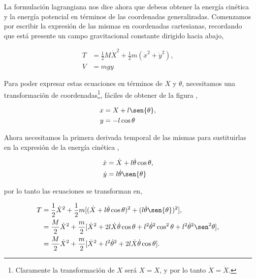 \documentclass[a4paper,10pt]{article}
\numberwithin{equation}{section}
\begin{document}
\vspace{.3cm}

La formulación lagrangiana nos dice ahora que debeos obtener la energía cinética y la 
energía potencial en términos de las coordenadas generalizadas. Comenzamos por escribir 
la expresión de las mismas en coordenadas cartesianas, recordando que está presente un 
campo gravitacional constante dirigido hacia abajo,

\begin{align}
\label{eq:pendu5}
 T &= \frac{1}{2} M \dot{X}^2 + \frac{1}{2}m(\dot{x}^2+\dot{y}^2), \\
\label{eq:pendu6}
 V &= mgy
 \end{align}

Para poder expresar estas ecuaciones en términos de $X$ y $\theta$, necesitamos una 
transformación de coordenadas\footnote{Claramente la transformación de $X$ será $X = X$, 
y por lo tanto $\dot{X} = \dot{X}$.}, fáciles de obtener de la figura 
,

\begin{align}
 x &= X + l \sen{\theta}, \\
 y &= -l \cos{\theta}
\end{align}

Ahora necesitamos la primera derivada temporal de las mismas para sustituirlas en 
la expresión de la energía cinética ,

\begin{align}
 \dot{x} &= \dot{X} + l \dot{\theta} \cos{\theta}, \\
 \dot{y} &= l \dot{\theta} \sen{\theta}
\end{align}

por lo tanto las ecuaciones  se transforman en,

\begin{align}
 \begin{split}
  T &= \frac{1}{2} \dot{X}^2 + \frac{1}{2}m[(\dot{X}+ l \dot{\theta} \cos{\theta})^2 +
    (l \dot{\theta} \sen{\theta})^2], \\
    &= \frac{M}{2}\dot{X}^2 + \frac{m}{2}[\dot{X}^2 + 2l\dot{X}\dot{\theta}\cos{\theta} + 
    l^2 \dot{\theta}^2 \cos^2{\theta} + l^2 \dot{\theta}^2 \sen^2{\theta}], \\
    &= \frac{M}{2}\dot{X}^2 + \frac{m}{2}[\dot{X}^2 + l^2 \dot{\theta}^2 + 
    2l\dot{X}\dot{\theta}\cos{\theta}].
 \end{split}
\end{align}
\end{document}
